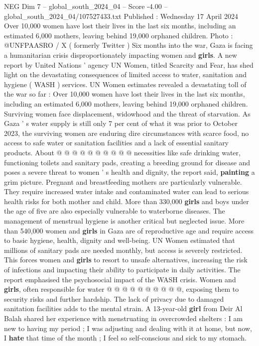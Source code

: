 \begin{textsample}{NEG Dim 7 – global\_south\_2024\_04 – Score -4.00 – global\_south\_2024\_04/107527433.txt}  \label{ex:f7_neg_350}
Published : Wednesday 17 April 2024 Over 10,000 women have lost their lives in the last six months, including an estimated 6,000 mothers, leaving behind 19,000 orphaned children.
Photo : @UNFPAASRO / X ( formerly Twitter ) Six months into the war, Gaza is facing a humanitarian crisis disproportionately impacting women and \textbf{girls}.
A new report by United Nations ' agency UN Women, titled Scarcity and Fear, has shed light on the devastating consequences of limited access to water, sanitation and hygiene ( WASH ) services.
UN Women estimates revealed a devastating toll of the war so far : Over 10,000 women have lost their lives in the last six months, including an estimated 6,000 mothers, leaving behind 19,000 orphaned children.
Surviving women face displacement, widowhood and the threat of starvation.
As Gaza ' s water supply is still only 7 per cent of what it was prior to October 2023, the surviving women are enduring dire circumstances with scarce food, no access to safe water or sanitation facilities and a lack of essential sanitary products.
About @ @ @ @ @ @ @ @ @ @ necessities like safe drinking water, functioning toilets and sanitary pads, creating a breeding ground for disease and poses a severe threat to women ' s health and dignity, the report said, \textbf{painting} a grim picture.
Pregnant and breastfeeding mothers are particularly vulnerable.
They require increased water intake and contaminated water can lead to serious health risks for both mother and child.
More than 330,000 \textbf{girls} and boys under the age of five are also especially vulnerable to waterborne diseases.
The management of menstrual hygiene is another critical but neglected issue.
More than 540,000 women and \textbf{girls} in Gaza are of reproductive age and require access to basic hygiene, health, dignity and well-being.
UN Women estimated that millions of sanitary pads are needed monthly, but access is severely restricted.
This forces women and \textbf{girls} to resort to unsafe alternatives, increasing the risk of infections and impacting their ability to participate in daily activities.
The report emphasised the psychosocial impact of the WASH crisis.
Women and \textbf{girls}, often responsible for water @ @ @ @ @ @ @ @ @ @, exposing them to security risks and further hardship.
The lack of privacy due to damaged sanitation facilities adds to the mental strain.
A 13-year-old \textbf{girl} from Deir Al Balah shared her experience with menstruating in overcrowded shelters : I am new to having my period ; I was adjusting and dealing with it at home, but now, I \textbf{hate} that time of the month ; I feel so self-conscious and sick to my stomach.

\end{textsample}
